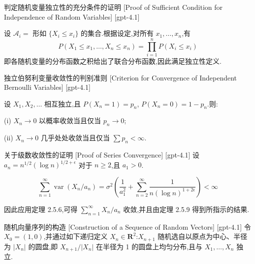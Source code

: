 \documentclass[UTF8]{ctexart}
\begin{document}
    
    
    \begin{prf}
        {判定随机变量独立性的充分条件的证明}
        [Proof of Sufficient Condition for Independence of Random Variables]
        [gpt-4.1]
        
设 $\mathcal{A}_i =$ 形如 $\{X_i \leq x_i\}$ 的集合.根据设定,对所有 $x_1, \ldots, x_n$,有
\[
P(X_1 \leq x_1, \ldots, X_n \leq x_n) = \prod_{i=1}^{n} P(X_i \leq x_i)
\]
即各随机变量的分布函数之积给出了联合分布函数,因此满足独立性定义.

    \end{prf}
    
    
    
    \begin{thm}
        {独立伯努利变量收敛性的判别准则}
        [Criterion for Convergence of Independent Bernoulli Variables]
        [gpt-4.1]
        
设 $X_1, X_2, \dots$ 相互独立,且 $P(X_n = 1) = p_n$, $P(X_n = 0) = 1 - p_n$.则:

(i) $X_n \to 0$ 以概率收敛当且仅当 $p_n \to 0$;

(ii) $X_n \to 0$ 几乎处处收敛当且仅当 $\sum p_n < \infty$.

    \end{thm}
    
    
    
    \begin{prf}
        {关于级数收敛性的证明}
        [Proof of Series Convergence]
        [gpt-4.1]
        设 $a_{n} = n^{1/2} (\log n)^{1/2 + \epsilon}$ 对于 $n \geq 2$,且 $a_{1} > 0$.

\[
\sum_{n=1}^{\infty} \operatorname{var}\left( X_{n} / a_{n} \right) = \sigma^{2} \left( \frac{1}{a_{1}^{2}} + \sum_{n=2}^{\infty} \frac{1}{n (\log n)^{1 + 2\epsilon}} \right) < \infty
\]

因此应用定理 2.5.6,可得 $\sum_{n=1}^{\infty} X_{n} / a_{n}$ 收敛,并且由定理 2.5.9 得到所指示的结果.

    \end{prf}
    
    
    
    \begin{dfn}
        {随机向量序列的构造}
        [Construction of a Sequence of Random Vectors]
        [gpt-4.1]
        令 $X_0 = (1, 0)$,并通过如下递归定义 $X_n \in \mathbf{R}^2$:$X_{n+1}$ 随机选自以原点为中心、半径为 $|X_n|$ 的圆盘,即 $X_{n+1} / |X_n|$ 在半径为 1 的圆盘上均匀分布,且与 $X_1, \ldots, X_n$ 独立.
    \end{dfn}
    
\end{document}
